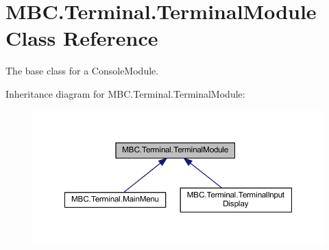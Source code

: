 \hypertarget{class_m_b_c_1_1_terminal_1_1_terminal_module}{\section{M\-B\-C.\-Terminal.\-Terminal\-Module Class Reference}
\label{class_m_b_c_1_1_terminal_1_1_terminal_module}
}


The base class for a Console\-Module. 




Inheritance diagram for M\-B\-C.\-Terminal.\-Terminal\-Module\-:
\nopagebreak
\begin{figure}[H]
\begin{center}
\leavevmode
\includegraphics[width=350pt]{class_m_b_c_1_1_terminal_1_1_terminal_module__inherit__graph}
\end{center}
\end{figure}
